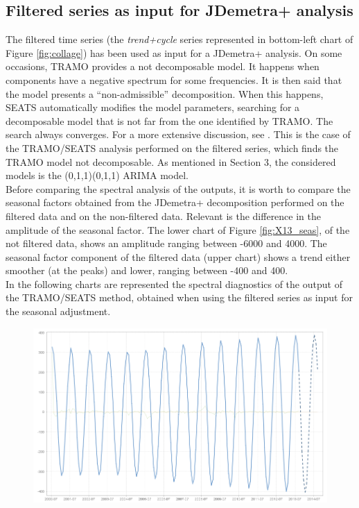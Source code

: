 \documentclass[english,blauw]{cbsdiscussionpaper}
\begin{document}
\subsection{Filtered series as input for JDemetra+ analysis}
The filtered time series (the \textit{trend+cycle} series represented in bottom-left chart of Figure \ref{fig:collage}) has been used as input for a JDemetra+ analysis. On some occasions, TRAMO provides a not decomposable model. It happens when components have a negative spectrum for some frequencies. It is then said that the model presents a “non-admissible” decomposition. When this happens, SEATS automatically modifies the model parameters, searching for a decomposable model that is not far from the one identified by TRAMO. The search always converges. For a more extensive discussion, see \citep{mar2008}. This is the case of the TRAMO/SEATS analysis performed on the filtered series, which finds the TRAMO model not decomposable. As mentioned in Section 3, the considered models is the (0,1,1)(0,1,1) ARIMA model.\\ Before comparing the spectral analysis of the outputs, it is worth to compare the seasonal factors obtained from the JDemetra+ decomposition performed on the filtered data and on the non-filtered data. Relevant is the difference in the amplitude of the seasonal factor. The lower chart of Figure \ref{fig:X13_seas}, of the not filtered data, shows an amplitude ranging between -6000 and 4000. The seasonal factor component of the filtered data (upper chart) shows a trend either smoother (at the peaks) and lower, ranging between -400 and 400.\\In the following charts are represented the spectral diagnostics of the output of the TRAMO/SEATS method, obtained when using the filtered series as input for the seasonal adjustment.
\begin{figure}[H]
\includegraphics[width=\linewidth]{../images/capitolo4/X13_seas_cmp_filtered.jpg}
\end{figure}
\end{document}
